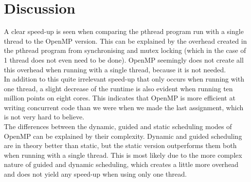 \documentclass[a4paper,12px]{article}
\begin{document}
\section{Discussion}
A clear speed-up is seen when comparing the pthread program run with a single
thread to the OpenMP version. This can be explained by the overhead created in
the pthread program from synchronising and mutex locking (which in the case of 1
thread does not even need to be done). OpenMP seemingly does not create all this
overhead when running with a single thread, because it is not needed.\\
In addition to this quite irrelevant speed-up that only occurs when running with
one thread, a slight decrease of the runtime is also evident when running ten
million points on eight cores. This indicates that OpenMP is more efficient at
writing concurrent code than we were when we made the last assignment, which is
not very hard to believe. \\
The differences between the dynamic, guided and static scheduling modes of
OpenMP can be explained by their complexity. Dynamic and guided scheduling are
in theory better than static, but the static version outperforms them both when
running with a single thread. This is most likely due to the more complex nature
of guided and dynamic scheduling, which creates a little more overhead and does
not yield any speed-up when using only one thread.



%
%
\end{document}
